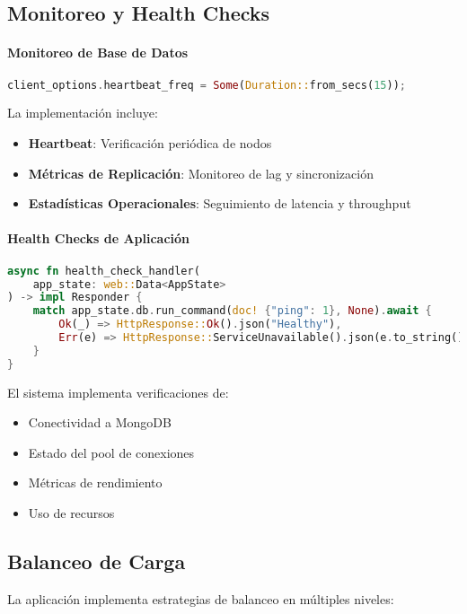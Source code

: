 \documentclass[12pt,letterpaper]{article}
\begin{document}
\subsection{Monitoreo y Health Checks}
\paragraph{Monitoreo de Base de Datos}
\begin{lstlisting}[language=rust]
client_options.heartbeat_freq = Some(Duration::from_secs(15));
\end{lstlisting}

La implementación incluye:
\begin{itemize}
    \item \textbf{Heartbeat}: Verificación periódica de nodos
    \item \textbf{Métricas de Replicación}: Monitoreo de lag y sincronización
    \item \textbf{Estadísticas Operacionales}: Seguimiento de latencia y throughput
\end{itemize}

\paragraph{Health Checks de Aplicación}
\begin{lstlisting}[language=rust]
async fn health_check_handler(
    app_state: web::Data<AppState>
) -> impl Responder {
    match app_state.db.run_command(doc! {"ping": 1}, None).await {
        Ok(_) => HttpResponse::Ok().json("Healthy"),
        Err(e) => HttpResponse::ServiceUnavailable().json(e.to_string())
    }
}
\end{lstlisting}

El sistema implementa verificaciones de:
\begin{itemize}
    \item Conectividad a MongoDB
    \item Estado del pool de conexiones
    \item Métricas de rendimiento
    \item Uso de recursos
\end{itemize}

\subsection{Balanceo de Carga}
La aplicación implementa estrategias de balanceo en múltiples niveles:
\end{document}

